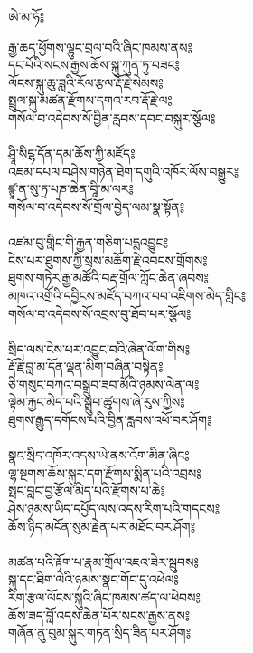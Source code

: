{\ti ཨེ་མ་ཧོ༔

རྒྱ་ཆད་ཕྱོགས་ལྷུང་བྲལ་བའི་ཞིང་ཁམས་ནས༔\\
དང་པོའི་སངས་རྒྱས་ཆོས་སྐུ་ཀུན་ཏུ་བཟང༔\\
ལོངས་སྐུ་ཆུ་ཟླའི་རོལ་རྩལ་རྡོ་རྗེ་སེམས༔\\
སྤྲུལ་སྐུ་མཚན་རྫོགས་དགའ་རབ་རྡོ་རྗེ་ལ༔\\
གསོལ་བ་འདེབས་སོ་བྱིན་རླབས་དབང་བསྐུར་སྩོལ༔\\
\\
ཤྲཱི་སིངྷ་དོན་དམ་ཆོས་ཀྱི་མཛོད༔\\
འཇམ་དཔལ་བཤེས་གཉེན་ཐེག་དགུའི་འཁོར་ལོས་བསྒྱུར༔\\
ཛྙཱ་ན་སུ་ཏྲ་པཎ་ཆེན་བཱི་མ་ལར༔\\
གསོལ་བ་འདེབས་སོ་གྲོལ་བྱེད་ལམ་སྣ་སྟོན༔\\
\\
འཛམ་བུ་གླིང་གི་རྒྱན་གཅིག་པདྨའབྱུང༔\\
ངེས་པར་ཐུགས་ཀྱི་སྲས་མཆོག་རྗེ་འབངས་གྲོགས༔\\
ཐུགས་གཏེར་རྒྱ་མཚོའི་བརྡ་གྲོལ་ཀློང་ཆེན་ཞབས༔\\
མཁའ་འགྲོའི་དབྱིངས་མཛོད་བཀའ་བབ་འཇིགས་མེད་གླིང༔\\
གསོལ་བ་འདེབས་སོ་འབྲས་བུ་ཐོབ་པར་སྩོལ༔\\
\\
སྲིད་ལས་ངེས་པར་འབྱུང་བའི་ཞེན་ལོག་གིས༔\\
རྡོ་རྗེ་བླ་མ་དོན་ལྡན་མིག་བཞིན་བསྟེན༔\\
ཅི་གསུང་བཀའ་བསྒྲུབ་ཟབ་མོའི་ཉམས་ལེན་ལ༔\\
ལྟེམ་རྐྱང་མེད་པའི་སྒྲུབ་ཚུགས་ཞེ་རུས་ཀྱིས༔\\
ཐུགས་རྒྱུད་དགོངས་པའི་བྱིན་རླབས་འཕོ་བར་ཤོག༔\\
\\
སྣང་སྲིད་འཁོར་འདས་ཡེ་ནས་འོག་མིན་ཞིང༔\\
ལྷ་སྔགས་ཆོས་སྐུར་དག་རྫོགས་སྨིན་པའི་འབྲས༔\\
སྤང་བླང་བྱ་རྩོལ་མེད་པའི་རྫོགས་པ་ཆེ༔\\
ཤེས་ཉམས་ཡིད་དཔྱོད་ལས་འདས་རིག་པའི་གདངས༔\\
ཆོས་ཉིད་མངོན་སུམ་རྗེན་པར་མཐོང་བར་ཤོག༔\\
\\
མཚན་པའི་རྟོག་པ་རྣམ་གྲོལ་འཇའ་ཟེར་སྦུབས༔\\
སྐུ་དང་ཐིག་ལེའི་ཉམས་སྣང་གོང་དུ་འཕེལ༔\\
རིག་རྩལ་ལོངས་སྐུའི་ཞིང་ཁམས་ཚད་ལ་ཕེབས༔\\
ཆོས་ཟད་བློ་འདས་ཆེན་པོར་སངས་རྒྱས་ནས༔\\
གཞོན་ནུ་བུམ་སྐུར་གཏན་སྲིད་ཟིན་པར་ཤོག༔\\
}
